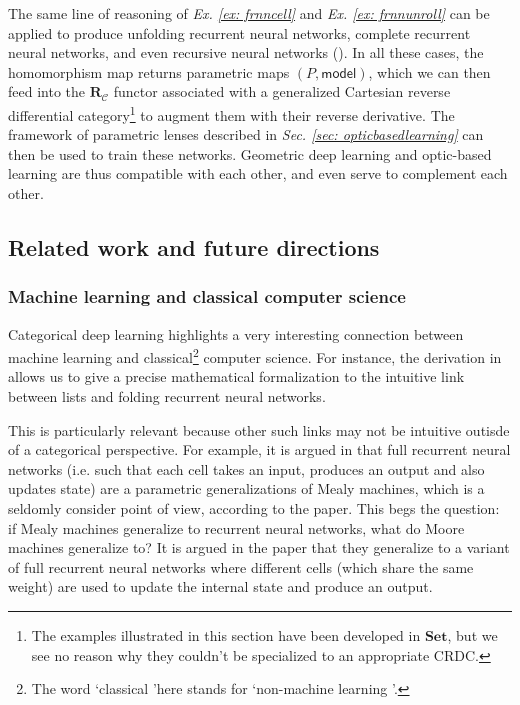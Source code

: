 \documentclass[12pt,a4paper,openright,twoside]{report}
\theoremstyle{plain}
\theoremstyle{definition}
\begin{document}
The same line of reasoning of \textit{Ex. \ref{ex: frnncell}} and \textit{Ex. \ref{ex: frnnunroll}} can be applied to produce unfolding recurrent neural networks, complete recurrent neural networks, and even recursive neural networks (\cite{gavranovicposition}). In all these cases, the homomorphism map returns parametric maps $(P,\mathsf{model})$, which we can then feed into the $\mathbf{R}_{\mathcal{C}}$ functor associated with a generalized Cartesian reverse differential category\footnote{The examples illustrated in this section have been developed in $\mathbf{Set}$, but we see no reason why they couldn't be specialized to an appropriate CRDC.} to augment them with their reverse derivative. The framework of parametric lenses described in 
\textit{Sec. \ref{sec: opticbasedlearning}} can then be used to train these networks. Geometric deep learning and optic-based learning are thus compatible with each other, and even serve to complement each other.


\subsection{Related work and future directions}

\subsubsection{Machine learning and classical computer science}

Categorical deep learning highlights a very interesting connection between machine learning and classical\footnote{The word \lq classical \rq here stands for \lq non-machine learning \rq .} computer science. For instance, the derivation in \cite{gavranovicposition} allows us to give a precise mathematical formalization to the intuitive link between lists and folding recurrent neural networks. 

This is particularly relevant because other such links may not be intuitive outisde of a categorical perspective. For example, it is argued in \cite{gavranovicposition} that full recurrent neural networks (i.e. such that each cell takes an input, produces an output and also updates state) are a parametric generalizations of Mealy machines, which is a seldomly consider point of view, according to the paper. This begs the question: if Mealy machines generalize to recurrent neural networks, what do Moore machines generalize to? It is argued in the paper that they generalize to a variant of full recurrent neural networks where different cells (which share the same weight) are used to update the internal state and produce an output.
\end{document}
